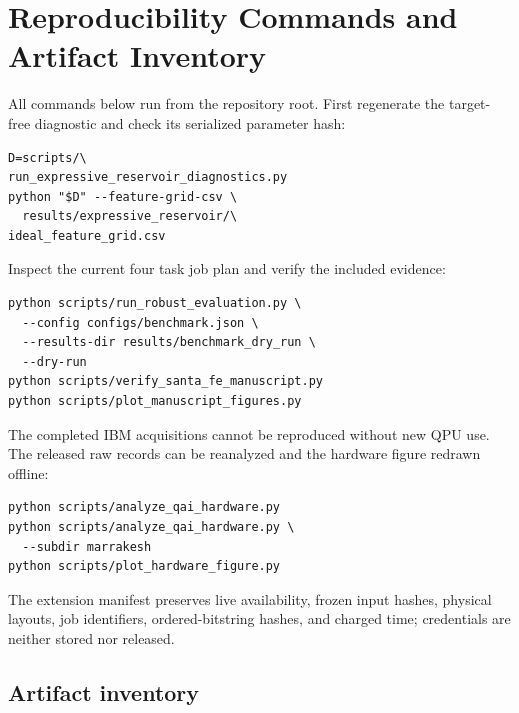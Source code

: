 \documentclass[10pt,conference]{IEEEtran}
\begin{document}
\section{Reproducibility Commands and Artifact Inventory}
\label{app:reproducibility}

All commands below run from the repository root.  First regenerate the
target-free diagnostic and check its serialized parameter hash:
\begin{scriptsize}
\begin{verbatim}
D=scripts/\
run_expressive_reservoir_diagnostics.py
python "$D" --feature-grid-csv \
  results/expressive_reservoir/\
ideal_feature_grid.csv
\end{verbatim}
\end{scriptsize}
Inspect the current four task job plan and verify the included evidence:
\begin{scriptsize}
\begin{verbatim}
python scripts/run_robust_evaluation.py \
  --config configs/benchmark.json \
  --results-dir results/benchmark_dry_run \
  --dry-run
python scripts/verify_santa_fe_manuscript.py
python scripts/plot_manuscript_figures.py
\end{verbatim}
\end{scriptsize}
The completed IBM acquisitions cannot be reproduced without new QPU use. The
released raw records can be reanalyzed and the hardware figure redrawn offline:
\begin{scriptsize}
\begin{verbatim}
python scripts/analyze_qai_hardware.py
python scripts/analyze_qai_hardware.py \
  --subdir marrakesh
python scripts/plot_hardware_figure.py
\end{verbatim}
\end{scriptsize}
The extension manifest preserves live availability, frozen input hashes,
physical layouts, job identifiers, ordered-bitstring hashes, and charged time;
credentials are neither stored nor released.

\subsection{Artifact inventory}
\end{document}
